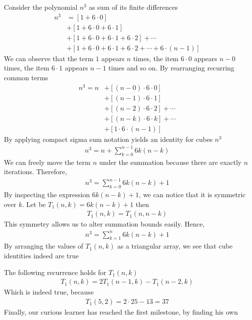 Consider the polynomial $n^3$ as sum of its finite differences
\begin{align*}
    n^3
    &= [1+6\cdot0] \\
    &+ [1+6\cdot0+6\cdot1] \\
    &+ [1+6\cdot0+6\cdot1+6\cdot2] + \cdots \\
    &+ [1+6\cdot0+6\cdot1+6\cdot2+\cdots+6\cdot(n-1)]
\end{align*}
We can observe that the term $1$ appears $n$ times, the item $6\cdot0$ appears $n-0$ times,
the item $6\cdot1$ appears $n-1$ times and so on.
By rearranging recurring common terms
\begin{align*}
    n^3 = n
    &+ [(n-0) \cdot 6 \cdot 0] \\
    &+ [(n-1)\cdot6\cdot1] \\
    &+ [(n-2)\cdot6\cdot2] + \cdots \\
    &+ [(n-k)\cdot 6 \cdot k] + \cdots \\
    &+ [1\cdot6\cdot(n-1)]
\end{align*}
By applying compact sigma sum notation yields an identity for cubes $n^3$
\begin{align*}
    n^3 = n + \sum_{k=0}^{n-1} 6k(n-k)
\end{align*}
We can freely move the term $n$ under the summation because there are exactly $n$ iterations.
Therefore,
\begin{align*}
    n^3 = \sum_{k=0}^{n-1} 6k(n-k) + 1
\end{align*}
By inspecting the expression $6k(n-k) + 1$, we can notice that it is symmetric over $k$.
Let be $T_{1} (n,k) = 6k(n-k) + 1$ then
\begin{align*}
    T_{1} (n,k) = T_{1} (n,n-k)
\end{align*}
This symmetry allows us to alter summation bounds easily.
Hence,
\begin{align*}
    n^3 = \sum_{k=1}^{n} 6k(n-k) + 1
\end{align*}
By arranging the values of $T_{1} (n,k)$ as a triangular array, we see that cube identities indeed are true

The following recurrence holds for $T_{1} (n,k)$
\begin{align*}
    T_{1} (n, k) = 2T_{1} (n-1, k) - T_{1} (n-2, k)
\end{align*}
Which is indeed true, because
\begin{align*}
    T_{1} (5, 2) = 2 \cdot 25 - 13 = 37
\end{align*}
Finally, our curious learner has reached the first milestone, by finding his own
